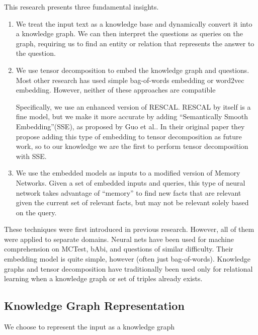 \documentclass[pageno]{jpaper}
\begin{document}
This research presents three fundamental insights.
\begin{enumerate}

    \item We treat the input text as a knowledge base and dynamically convert it
    into a knowledge graph. We can then interpret the questions as queries on
    the graph, requiring us to find an entity or relation that represents the
    answer to the question.

    \item We use tensor decomposition to embed the knowledge graph and
    questions. Most other research has used simple bag-of-words embedding or
    word2vec embedding. However, neither of these approaches are compatible

    Specifically, we use an enhanced version of
    RESCAL\cite{Nickel2011}. RESCAL by itself is a fine model, but we make it
    more accurate by adding ``Semantically Smooth Embedding''(SSE), as proposed
    by Guo et al.\cite{Guo2015}. In their original paper they propose adding
    this type of embedding to tensor decomposition as future work, so to our
    knowledge we are the first to perform tensor decomposition with SSE.

    \item We use the embedded models as inputs to a modified version of Memory
    Networks. Given a set of embedded inputs and queries, this type of neural
    network takes advantage of ``memory'' to find new facts that are relevant
    given the current set of relevant facts, but may not be relevant solely
    based on the query.

\end{enumerate}

These techniques were first introduced in previous research. However, all of
them were applied to separate domains. Neural nets have been used for machine
comprehension on MCTest, bAbi, and questions of similar difficulty. Their
embedding model is quite simple, however (often just bag-of-words). Knowledge
graphs and tensor decomposition have traditionally been used only for relational
learning when a knowledge graph or set of triples already exists.

\subsection{Knowledge Graph Representation}
\label{Knowledge Graph Representation}
We choose to represent the input as a knowledge graph
\end{document}
